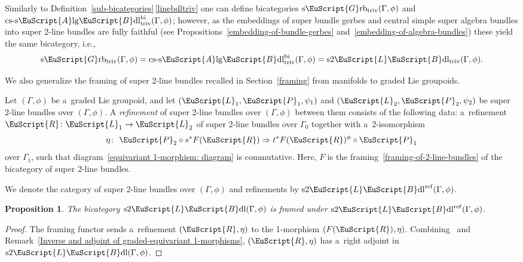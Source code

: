 \documentclass[pdftex]{sigma}
\numberwithin{equation}{section}
\newtheorem{Proposition}[Theorem]{Proposition}
 { \theoremstyle{definition}
\newtheorem{Definition}[Theorem]{Definition}
\newtheorem{Example}[Theorem]{Example}
\newtheorem{Remark}[Theorem]{Remark} }
\def\mathscr#1{\EuScript{#1}}
\newcommand{\LineBdl}{\mathscr{L}\mathscr{B}\mathrm{dl}}
\newcommand{\stwoLineBdl}{\mathrm{s}2\LineBdl}
\newcommand{\stwoLineBdltriv}{\mathrm{s}2\LineBdl_{\mathrm{triv}}}
\newcommand{\stwoLineBdlref}{\mathrm{s}2\LineBdl^{\mathrm{ref}}}
\newcommand{\Grbtriv}{\mathscr{G}\mathrm{rb}_{\mathrm{triv}}}
\newcommand{\sGrbtriv}{\mathrm{s}\Grbtriv}
\newcommand{\Alg}{\Incl\mathrm{lg}}
\newcommand{\cssAlg}{\mathrm{cs\text{-}s}\Alg}
\newcommand{\cssAlgBdlbi}{\cssAlg\mathscr{B}\mathrm{dl}^{\mathrm{bi}}}
\newcommand{\Incl}{\mathscr{A}}
\begin{document}
\begin{Remark}
\label{trivial-things}
Similarly to Definition~\ref{sub-bicategories}\,\ref{linebdltriv} one can define bicategories $\sGrbtriv(\Gamma,\phi)$ and $\cssAlgBdlbi_{\mathrm{triv}}(\Gamma,\phi)$; however, as the embeddings of super bundle gerbes and central simple super algebra bundles into super 2-line bundles are fully faithful (see Propositions~\ref{embedding-of-bundle-gerbes} and~\ref{embedding-of-algebra-bundles}) these yield the same bicategory, i.e.,
\begin{equation*}
\sGrbtriv(\Gamma,\phi) =\cssAlgBdlbi_{\mathrm{triv}}(\Gamma,\phi)= \stwoLineBdltriv(\Gamma,\phi).
\end{equation*}
\end{Remark}


We also generalize the framing of super 2-line bundles recalled in Section~\ref{framing} from manifolds to graded Lie groupoids.

\begin{Definition} \label{definition: refinement of a graded equivariant 2-line bundle}
 Let $(\Gamma,\phi)$ be a~graded Lie groupoid, and let $(\mathscr{L}_1,\mathscr{P}_1,\psi_1)$ and $(\mathscr{L}_2,\mathscr{P}_2,\psi_2)$
 be super 2-line bundles over $(\Gamma,\phi)$. A \emph{refinement} of super 2-line bundles over $(\Gamma,\phi)$
 between them consists of the following data: a~refinement $\mathscr{R}\colon \mathscr{L}_1 \to \mathscr{L}_2$
 of super 2-line bundles over $\Gamma_0$ together with a~2-isomorphism
 \[%
 \eta \colon\ \mathscr{P}_2 \circ s^*F(\mathscr{R}) \Rightarrow t^*F(\mathscr{R})^\phi \circ \mathscr{P}_1
 \]
 over $\Gamma_1$, such that diagram~\eqref{equivariant 1-morphism: diagram} is commutative.
 Here, $F$ is the framing~\eqref{framing-of-2-line-bundles} of the bicategory of super 2-line bundles.
\end{Definition}

We denote the category of super 2-line bundles over $(\Gamma,\phi)$ and refinements by $\stwoLineBdlref(\Gamma,\phi)$.
\begin{Proposition} \label{proposition: graded equivariant 2-line bundles are framed}
 The bicategory $\stwoLineBdl(\Gamma,\phi)$ is framed under $\stwoLineBdlref(\Gamma,\phi)$.
\end{Proposition}
\begin{proof}
 The framing functor sends a~refinement $(\mathscr{R},\eta)$ to the 1-morphism $(F(\mathscr{R}),\eta)$. Combining~\cite[Proposition~3.5.2]{Kristel2020}
 and Remark~\ref{Inverse and adjoint of graded-equivariant 1-morphisms}, $(\mathscr{R},\eta)$ has a~right adjoint in $\stwoLineBdl(\Gamma,\phi)$.
\end{proof}
\end{document}
